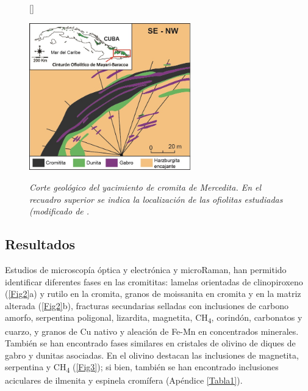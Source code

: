 \documentclass[a4paper,11pt]{article}
\begin{document}
	\begin{figure}[h]
		[\FBwidth]
		{\caption{\sl Corte geológico del yacimiento de cromita de Mercedita. En el recuadro superior se indica la localización de las ofiolitas estudiadas (modificado de \cite{Pujol-Sola2018}.}
		\label{Fig1}}
		{\includegraphics[width=7cm]{Figura1.jpg}}
	\end{figure}
	
	\begin{multicols}{2}
		\section{Resultados}
		Estudios de microscopía óptica y electrónica y microRaman, han permitido identificar diferentes fases en las cromititas: lamelas orientadas de clinopiroxeno (\ref{Fig2}a) y rutilo en la cromita, granos de moissanita en cromita y en la matriz alterada (\ref{Fig2}b), fracturas secundarias selladas con inclusiones de carbono amorfo, serpentina poligonal, lizardita, magnetita, CH\textsubscript{4}, corindón, carbonatos y cuarzo, y granos de Cu nativo y aleación de Fe-Mn en concentrados minerales. 
		También se han encontrado fases similares en cristales de olivino de diques de gabro y dunitas asociadas. En el olivino destacan las inclusiones de magnetita, serpentina y CH\textsubscript{4} (\ref{Fig3}); si bien, también se han encontrado inclusiones aciculares de ilmenita y espinela cromífera (Apéndice \ref{Tabla1}).
	\end{multicols}
	
\end{document}

